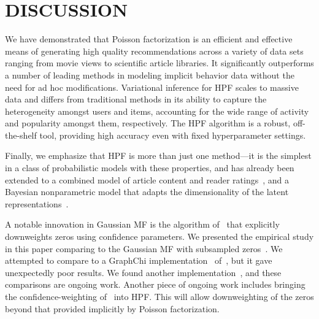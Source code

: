 \section{DISCUSSION}
\vspace{-0.1in}
We have demonstrated that Poisson factorization is an efficient and
effective means of generating high quality recommendations across a
variety of data sets ranging from movie views to scientific article
libraries. It significantly outperforms a number of leading methods in
modeling implicit behavior data without the need for ad hoc
modifications. Variational inference for HPF scales to massive data
and differs from traditional methods in its ability to capture the
heterogeneity amongst users and items, accounting for the wide range
of activity and popularity amongst them, respectively. The HPF
algorithm is a robust, off-the-shelf tool, providing high accuracy
even with fixed hyperparameter settings.

Finally, we emphasize that HPF is more than just one method---it is
the simplest in a class of probabilistic models with these properties,
and has already been extended to a combined model of article content
and reader ratings~\cite{gopalan2014content}, and a Bayesian
nonparametric model that adapts the dimensionality of the latent
representations~\cite{gopalan2014bayesian}.

A notable innovation in Gaussian MF is the algorithm
of~\cite{Hu:2008p9402} that explicitly downweights zeros using
confidence parameters. We presented the empirical study in this paper
comparing to the Gaussian MF with subsampled zeros~\cite{Koren:2009}.
We attempted to compare to a GraphChi
implementation~\cite{kyrola2012graphchi} of~\cite{Hu:2008p9402}, but
it gave unexpectedly poor results. We found another implementation~\cite{Wang:2011b},
and these comparisons are ongoing work. Another piece of ongoing work
includes bringing the confidence-weighting of~\cite{Hu:2008p9402} into
HPF. This will allow downweighting of the zeros beyond that provided
implicitly by Poisson factorization.


